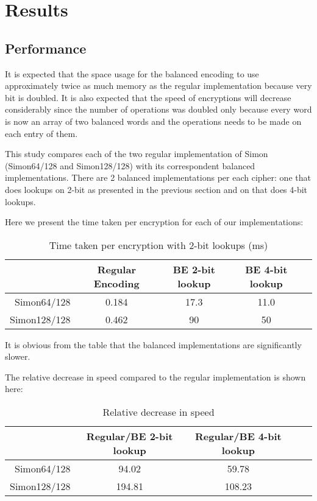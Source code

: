 \documentclass[conference]{IEEEtran}
\begin{document}
\section{Results}

\subsection{Performance}

It is expected that the space usage for the balanced encoding to use approximately twice as much memory as the regular implementation because very bit is doubled. It is also expected that the speed of encryptions will decrease considerably since the number of operations was doubled only because every word is now an array of two balanced words and the operations needs to be made on each entry of them. 

This study compares each of the two regular implementation of Simon (Simon64/128 and Simon128/128) with its correspondent balanced implementations. There are 2 balanced implementations per each cipher: one that does lookups on 2-bit as presented in the previous section and on that does 4-bit lookups.

Here we present the time taken per encryption for each of our implementations:

\begin{table}[htbp]
  \renewcommand{\arraystretch}{1.3}
  \caption{Time taken per encryption with 2-bit lookups (ms)}
  \vspace{0.05 in}
  \label{tab:space2}
  \centering
  \begin{tabular}{r|cccp{0.5in}}
    ~ & Regular Encoding  & BE 2-bit lookup & BE 4-bit lookup \\ \hline
    Simon64/128  & 0.184 & 17.3 & 11.0\\
    Simon128/128 & 0.462 & 90 & 50\\
  \end{tabular}
\end{table}

It is obvious from the table that the balanced implementations are significantly slower.

The relative decrease in speed compared to the regular implementation is shown here:

\begin{table}[htbp]
  \renewcommand{\arraystretch}{1.3}
  \caption{Relative decrease in speed}
  \vspace{0.05 in}
  \label{tab:space2}
  \centering
  \begin{tabular}{r|cccp{0.5in}}
    ~ & Regular/BE 2-bit lookup & Regular/BE 4-bit lookup \\ \hline
    Simon64/128  & 94.02 & 59.78\\
    Simon128/128 & 194.81 & 108.23\\
  \end{tabular}
\end{table}
\end{document}
